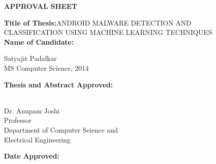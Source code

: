 \newpage
\begin{titlepage}
\vspace{0.6in}
\begin{singlespace}

\begin{center}
\vspace{0.1in}
\large{\bf APPROVAL SHEET}
\bigskip \bigskip
\end{center}

\begin{flushleft}
{\bf Title of Thesis:}{\hspace{3mm}}ANDROID MALWARE DETECTION AND CLASSIFICATION USING MACHINE LEARNING TECHNIQUES\\
\vspace{0.5in}
{\bf Name of Candidate:}{\hspace{3mm}} \parbox[t]{2in}{Satyajit Padalkar \\ MS Computer Science, 2014}
\end{flushleft}

\vspace{0.5in}

\begin{flushleft}
{\bf Thesis and Abstract Approved:}{\hspace{3mm}} 
\parbox[t]{2.5in}{\underline{\hspace{2.0in}}\\ 
	Dr. Anupam Joshi\\
	Professor \\
	Department of Computer Science and \\
	Electrical Engineering}
\end{flushleft}

\vspace{0.8in}

\begin{flushleft}
{\bf Date Approved:}{\hspace{3mm}} \underline{\hspace{2.5in}}\\
\end{flushleft}

\end{singlespace}
\end{titlepage}
\par\vfil
